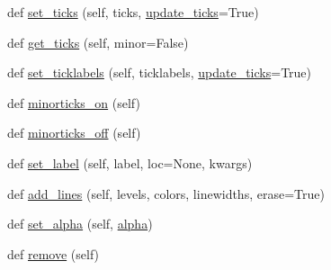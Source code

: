 \begin{DoxyCompactItemize}
def \hyperlink{classmatplotlib_1_1colorbar_1_1ColorbarBase_a18e35f3170680d0b908bbbe80773042c}{set\+\_\+ticks} (self, ticks, \hyperlink{classmatplotlib_1_1colorbar_1_1ColorbarBase_a06fc38a855f101d6ab40327b4033f6af}{update\+\_\+ticks}=True)
\item 
def \hyperlink{classmatplotlib_1_1colorbar_1_1ColorbarBase_ae6dbd8841951093df7c5e8cc6d136b81}{get\+\_\+ticks} (self, minor=False)
\item 
def \hyperlink{classmatplotlib_1_1colorbar_1_1ColorbarBase_a5e0112e4eab34a20bb4ba9f5a2603277}{set\+\_\+ticklabels} (self, ticklabels, \hyperlink{classmatplotlib_1_1colorbar_1_1ColorbarBase_a06fc38a855f101d6ab40327b4033f6af}{update\+\_\+ticks}=True)
\item 
def \hyperlink{classmatplotlib_1_1colorbar_1_1ColorbarBase_a52c9736842933eaf83f295f8375015aa}{minorticks\+\_\+on} (self)
\item 
def \hyperlink{classmatplotlib_1_1colorbar_1_1ColorbarBase_a45304477bf72ebc2562d12b53a8c45b5}{minorticks\+\_\+off} (self)
\item 
def \hyperlink{classmatplotlib_1_1colorbar_1_1ColorbarBase_a8e5a407c926d52068a87c5db0ce1d774}{set\+\_\+label} (self, label, loc=None, kwargs)
\item 
def \hyperlink{classmatplotlib_1_1colorbar_1_1ColorbarBase_adbbd5385693248f6f687424ecc021f06}{add\+\_\+lines} (self, levels, colors, linewidths, erase=True)
\item 
def \hyperlink{classmatplotlib_1_1colorbar_1_1ColorbarBase_acc66c0070fc65dd5f5e422b7e4e58b74}{set\+\_\+alpha} (self, \hyperlink{classmatplotlib_1_1colorbar_1_1ColorbarBase_a1079da131721a9ca9b6241ad638e9b5a}{alpha})
\item 
def \hyperlink{classmatplotlib_1_1colorbar_1_1ColorbarBase_a20d1a8b4995001e12e91383399149765}{remove} (self)
\end{DoxyCompactItemize}
